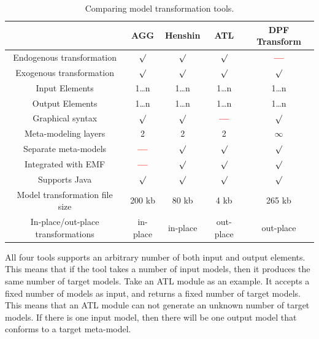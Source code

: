 \begin{table}[ht]
\renewcommand*\arraystretch{1.2}
\centering
\begin{tabular}{| c | c | c | c | c |}
\hline
& AGG & Henshin & ATL & DPF Transform \\
\hline
Endogenous transformation & $\surd$ & $\surd$ & $\surd$ & \textcolor{red}{\textbf{---}}\\

Exogenous transformation & $\surd$ & $\surd$ & $\surd$ & $\surd$\\

Input Elements & 1\ldots n & 1\ldots n & 1\ldots n & 1\ldots n\\

Output Elements & 1\ldots n & 1\ldots n & 1\ldots n & 1\ldots n\\

Graphical syntax & $\surd$ & $\surd$ & \textcolor{red}{\textbf{---}} & $\surd$
\\

Meta-modeling layers & 2 & 2 & 2 & $\infty$ \\

Separate meta-models & \textcolor{red}{\textbf{---}} &  $\surd$ &  $\surd$ &  $\surd$ \\

Integrated with EMF & \textcolor{red}{\textbf{---}} & $\surd$ & $\surd$ & $\surd$ \\ 

Supports Java & $\surd$ & $\surd$ & $\surd$ & $\surd$ \\ 

Model transformation file size & 200 kb & 80 kb & 4 kb & 265 kb\\

In-place/out-place transformations & in-place &
in-place & out-place  & out-place \\

\hline
\end{tabular}
\caption{Comparing model transformation tools.}
\label{tab:comparing}
\end{table} 

All four tools supports an arbitrary number of both input and
output elements. This means that if the tool takes a number of input models, then it
produces the same number of target models. Take an ATL module as an example. It
accepts a fixed number of models as input, and returns a fixed number of target
models. This means that an ATL module can not generate an unknown number of
target models. If there is one input model, then there will be one output model
that conforms to a target meta-model.

